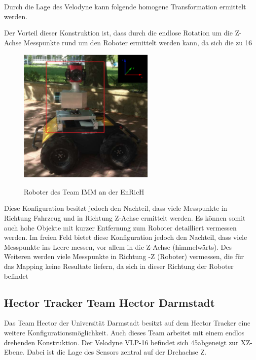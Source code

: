 


 
 Durch die Lage des Velodyne kann folgende homogene Transformation ermittelt werden.
 
  Der Vorteil dieser Konstruktion ist, dass durch die endlose Rotation um die Z-Achse Messpunkte rund um den Roboter ermittelt werden kann, da sich die zu  16
   
  
   \begin{figure}[H]
  	\centering
  	\includegraphics[width=0.6\textwidth]
  	{resources/IMM.PNG}
  	\caption[Roboter des Team IMM EnRicH]{Roboter des Team IMM an der EnRicH} \protect\cite{velodynee}
  	\label{fig:imm}
  \end{figure}
  
  Diese Konfiguration besitzt jedoch den Nachteil, dass viele Messpunkte in Richtung Fahrzeug und in Richtung Z-Achse ermittelt werden. Es können somit auch hohe Objekte mit kurzer Entfernung zum Roboter detailliert vermessen werden. Im freien Feld bietet diese Konfiguration jedoch den Nachteil, dass viele Messpunkte ins Leere messen, vor allem in die Z-Achse (himmelwärts). Des Weiteren werden viele Messpunkte in Richtung -Z (Roboter) vermessen, die für das Mapping keine Resultate liefern, da sich in dieser Richtung der Roboter befindet 
 

 	
  \subsection{Hector Tracker Team Hector Darmstadt}
 \label{subsec:hector}
Das Team Hector der Universität Darmstadt besitzt auf dem Hector Tracker eine weitere Konfigurationsmöglichkeit. Auch dieses Team arbeitet mit einem endlos drehenden Konstruktion. Der Velodyne VLP-16 befindet sich 45\degres abgeneigt zur XZ-Ebene. Dabei ist die Lage des Sensors zentral auf der Drehachse Z.

